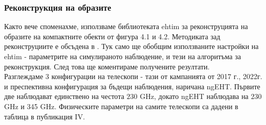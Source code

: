 \documentclass[12pt]{article}
\numberwithin{equation}{section}
\numberwithin{figure}{section}
\begin{document}
	\subsubsection{Реконструкция на образите}
	
	Както вече споменахме, използваме библиотеката ehtim за реконструцията на образите на компактните обекти от фигура 4.1 и 4.2. Методиката зад реконструциите е обсъдена в \cite{EHTIM}. Тук само ще обобщим използваните настройки на ehtim - параметрите на симулираното наблюдение, и тези на алгоритъма за реконструкция. След това ще коментираме получените резултати.\\
	
	Разглеждаме 3 конфигурации на телескопи - тази от кампанията от 2017 г., 2022г. и преспективна конфигурация за бъдещи наблюдения, наричана ngEHT. Първите две наблюдават единствено на честота $230$ GHz, докато ngEHT наблюдава на $230$ GHz и 345 GHz. Физическите параметри на самите телескопи са дадени в таблица в публикация IV. \\
	
\end{document}
